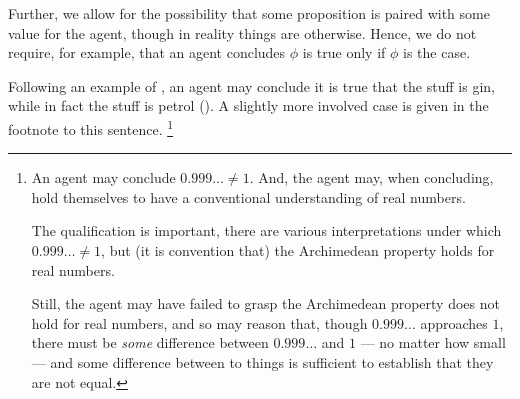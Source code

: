 \begin{note}
  Further, we allow for the possibility that some proposition is paired with some value for the agent, though in reality things are otherwise.
  Hence, we do not require, for example, that an agent concludes \(\phi\) is true only if \(\phi\) is the case.

  Following an example of \citeauthor{Williams:1979wi}, an agent may conclude it is true that the stuff is gin, while in fact the stuff is petrol (\citeyear[18]{Williams:1979wi}).
  A slightly more involved case is given in the footnote to this sentence.%
  \footnote{
    An agent may conclude \(0.999\dots \ne 1\).
    And, the agent may, when concluding, hold themselves to have a conventional understanding of real numbers.

    The qualification is important, there are various interpretations under which \(0.999\dots \ne 1\), but (it is convention that) the Archimedean property holds for real numbers.

    Still, the agent may have failed to grasp the Archimedean property does not hold for real numbers, and so may reason that, though \(0.999\dots\) approaches \(1\), there must be \emph{some} difference between \(0.999\dots\) and \(1\) --- no matter how small --- and some difference between to things is sufficient to establish that they are not equal.
  }
\end{note}


